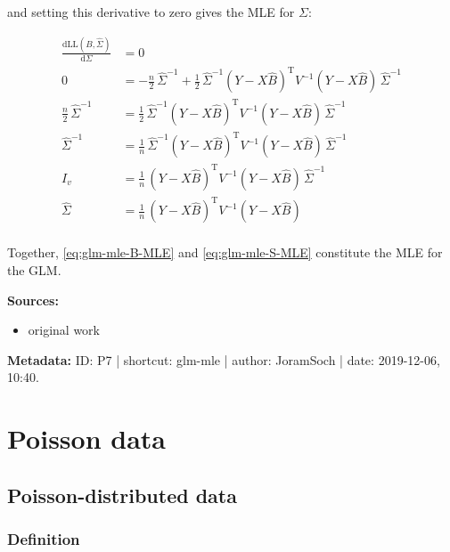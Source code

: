 \documentclass[a4paper,12pt,twoside]{book}
\begin{document}
and setting this derivative to zero gives the MLE for $\Sigma$:

\begin{equation} \label{eq:glm-mle-S-MLE}
\begin{split}
\frac{\mathrm{d}\mathrm{LL}(\hat{B},\hat{\Sigma})}{\mathrm{d}\Sigma} &= 0 \\
0 &= - \frac{n}{2} \, \hat{\Sigma}^{-1} + \frac{1}{2} \, \hat{\Sigma}^{-1} (Y - X\hat{B})^\mathrm{T} V^{-1} (Y - X\hat{B}) \, \hat{\Sigma}^{-1} \\
\frac{n}{2} \, \hat{\Sigma}^{-1} &= \frac{1}{2} \, \hat{\Sigma}^{-1} (Y - X\hat{B})^\mathrm{T} V^{-1} (Y - X\hat{B}) \, \hat{\Sigma}^{-1} \\
\hat{\Sigma}^{-1} &= \frac{1}{n} \, \hat{\Sigma}^{-1} (Y - X\hat{B})^\mathrm{T} V^{-1} (Y - X\hat{B}) \, \hat{\Sigma}^{-1} \\
I_v &= \frac{1}{n} \, (Y - X\hat{B})^\mathrm{T} V^{-1} (Y - X\hat{B}) \, \hat{\Sigma}^{-1} \\
\hat{\Sigma} &= \frac{1}{n} \, (Y - X\hat{B})^\mathrm{T} V^{-1} (Y - X\hat{B}) \\
\end{split}
\end{equation}

\vspace{1em}
Together, \eqref{eq:glm-mle-B-MLE} and \eqref{eq:glm-mle-S-MLE} constitute the MLE for the GLM.


\vspace{1em}
\textbf{Sources:}
\begin{itemize}
\item original work\end{itemize}


\vspace{1em}
\textbf{Metadata:} ID: P7 | shortcut: glm-mle | author: JoramSoch | date: 2019-12-06, 10:40.
\vspace{1em}



\pagebreak
\section{Poisson data}

\subsection{Poisson-distributed data}

\subsubsection[\textit{Definition}]{Definition} \label{sec:poiss-data}
\setcounter{equation}{0}
\end{document}
